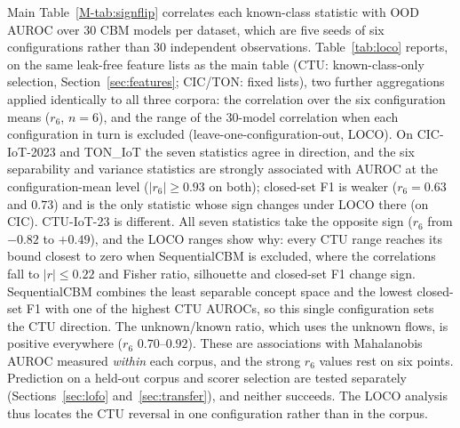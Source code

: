 \documentclass[journal]{IEEEtran}
\begin{document}
Main Table~\ref{M-tab:signflip} correlates each known-class statistic with OOD AUROC over
30 CBM models per dataset, which are five seeds of six configurations rather than 30
independent observations. Table~\ref{tab:loco} reports, on the same leak-free feature lists
as the main table (CTU: known-class-only selection, Section~\ref{sec:features}; CIC/TON:
fixed lists), two further aggregations applied identically to all three corpora: the
correlation over the six configuration means ($r_6$, $n{=}6$), and the range of the 30-model
correlation when each configuration in turn is excluded (leave-one-configuration-out, LOCO).
On CIC-IoT-2023 and TON\_IoT the seven statistics agree in direction, and the six separability
and variance statistics are strongly associated with AUROC at the configuration-mean level
($|r_6|\ge0.93$ on both); closed-set F1 is weaker ($r_6{=}0.63$ and $0.73$) and is the only
statistic whose sign changes under LOCO there (on CIC). CTU-IoT-23 is different. All seven
statistics take the opposite sign ($r_6$ from $-0.82$ to $+0.49$), and the LOCO ranges show why:
every CTU range reaches its bound closest to zero when SequentialCBM is excluded, where the
correlations fall to $|r|\le0.22$ and Fisher ratio, silhouette and closed-set F1 change sign.
SequentialCBM combines the least separable concept space and the lowest closed-set F1 with one
of the highest CTU AUROCs, so this single configuration sets the CTU direction. The
unknown/known ratio, which uses the unknown flows, is positive everywhere ($r_6$ $0.70$--$0.92$).
These are associations with Mahalanobis AUROC measured \emph{within} each corpus, and the strong
$r_6$ values rest on six points. Prediction on a held-out corpus and scorer selection are tested
separately (Sections~\ref{sec:lofo} and~\ref{sec:transfer}), and neither succeeds. The LOCO analysis thus
locates the CTU reversal in one configuration rather than in the corpus.
\end{document}
